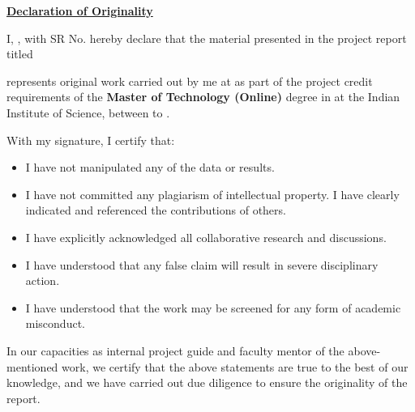 \documentclass[oneside,12pt]{IIScthesisPSnPDF}
\begin{document}
\begin{center}
\LARGE{\underline{\textbf{Declaration of Originality}}}
\end{center}
\noindent I, \textbf{\myauthor}, with SR No. \textbf{\mysrno} hereby declare that the material presented in the project report titled

\begin{center}
\textbf{\mytitle}
\end{center}

\noindent represents original work carried out by me at \textbf{\mycompanyname} as part of the project credit requirements of the \textbf{Master of Technology (Online)} degree in \textbf{\mystream} at the Indian Institute of Science, between \textbf{\mydegreejoindate} to \textbf{\mydegreeenddate}.

\noindent With my signature, I certify that:
\begin{itemize}
	\item I have not manipulated any of the data or results.
	\item I have not committed any plagiarism of intellectual property.	I have clearly indicated and referenced the contributions of others.
	\item I have explicitly acknowledged all collaborative research	and discussions.
	\item I have understood that any false claim will result in severe disciplinary action.
	\item I have understood that the work may be screened for any form of academic misconduct.
\end{itemize}

\vspace{10mm}

 \qquad

\vspace{10mm}

\noindent In our capacities as internal project guide and faculty mentor of the above-mentioned work, we certify that the above statements are true to the best of our knowledge, and we have carried out due diligence to ensure the originality of the report.

\vspace{10mm}

 \qquad\\
\vspace{5mm}
\end{document}
